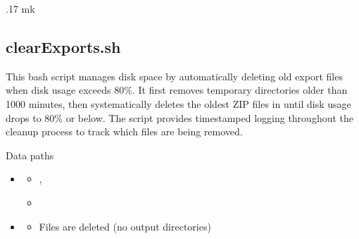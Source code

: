\documentclass[letterpaper,10pt,english]{sphinxmanual}
\begin{document}
.17 mk

\sphinxstepscope


\subsection{clearExports.sh}
\label{\detokenize{Architecture/scripts/clearExports:clearexports-sh}}\label{\detokenize{Architecture/scripts/clearExports::doc}}
\sphinxAtStartPar
This bash script manages disk space by automatically deleting old export files when disk usage exceeds 80\%. It first removes temporary directories older than 1000 minutes, then systematically deletes the oldest ZIP files in  until disk usage drops to 80\% or below. The script provides timestamped logging throughout the cleanup process to track which files are being removed.

\sphinxAtStartPar
{}


\sphinxAtStartPar
{}


\sphinxAtStartPar
Data paths
\begin{itemize}
\item {} \begin{description}
\begin{itemize}
\item {} 
\sphinxAtStartPar
{},

\item {} 
\sphinxAtStartPar
{}

\end{itemize}

\end{description}

\item {} \begin{description}
\begin{itemize}
\item {} 
\sphinxAtStartPar
Files are deleted (no output directories)

\end{itemize}

\end{description}

\end{itemize}
\end{document}
